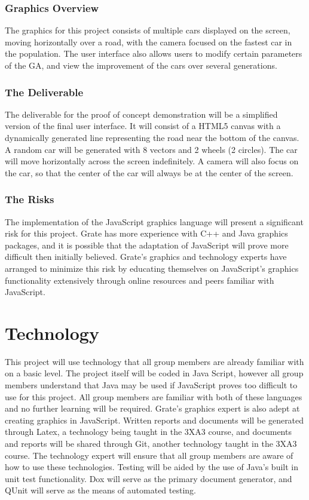 \documentclass{article}
\begin{document}
\subsubsection{Graphics Overview}
The graphics for this project consists of multiple cars displayed on the screen, 
moving horizontally over a road, with the camera focused on the fastest car in 
the population. The user interface also allows users to modify certain 
parameters of the GA, and view the improvement of the cars over several 
generations. 

\subsubsection{The Deliverable}
The deliverable for the proof of concept demonstration will be a simplified 
version of the final user interface. It will consist of a HTML5 canvas with a 
dynamically generated line representing the road near the bottom of the canvas. 
A random car will be generated with \textcolor{RoyalPurple}{8} vectors and 2 
wheels (2 
circles). The car will move horizontally across the screen indefinitely. A 
camera will also focus on the car, so that the center of the car will always be 
at the center of the screen.

\subsubsection{The Risks}
The implementation of the JavaScript graphics language will present a 
significant risk for this project. Grate has more experience with C++ and Java 
graphics packages, and it is possible that the adaptation of JavaScript will 
prove more difficult then initially believed. \textcolor{RoyalPurple}{Grate's} 
graphics and technology 
experts have arranged to minimize this risk by educating themselves on 
JavaScript's graphics functionality extensively through online resources and 
peers familiar with JavaScript.

\section{Technology}

This project will use technology that all group members are already familiar 
with on a basic level. The project itself will be coded in Java Script, however 
all group members understand that Java may be used if JavaScript proves too 
difficult to use for this project. All group members are familiar with both of 
these languages and no further learning will be required. 
\textcolor{RoyalPurple}{Grate's} graphics 
expert is also adept at creating graphics in JavaScript. Written reports and 
documents will be generated through Latex, a technology being taught in the 3XA3 
course, and documents and reports will be shared through Git, another technology 
taught in the 3XA3 course. The technology expert will ensure that all 
group members are aware of how to use these technologies. Testing will be aided 
by the use of Java’s built in unit test functionality. Dox will serve as the 
primary document generator, and QUnit will serve as the means of automated 
testing.
\end{document}
